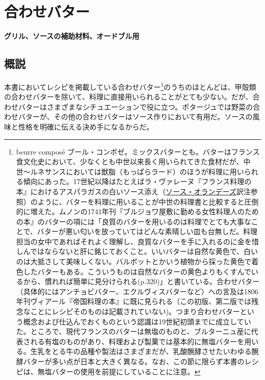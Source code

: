 \hypertarget{beurres-composes}{%
\section{合わせバター}\label{beurres-composes}}

\vspace{-1\zw}
\begin{center}
\textbf{グリル、ソースの補助材料、オードブル用}
\end{center}
\vspace{1\zw}


 

\hypertarget{observation-sur-les-beurres-composes}{%
\subsection{概説}\label{observation-sur-les-beurres-composes}}

本書においてレシピを掲載している合わせバター\footnote{beurre composé
  ブール・コンポゼ。ミックスバターとも。バターはフランス食文化史において、少なくとも中世以来長く用いられてきた食材だが、中世〜ルネサンスにおいては獣脂（もっぱらラード）のほうが料理に用いられる傾向にあった。17世紀以降はたとえばラ・ヴァレーヌ『フランス料理の本』におけるアスパラガスの白いソース添え（\protect\hyperlink{sauce-hollandaise}{ソース・オランデーズ}訳注参照）のように、バターを料理に用いることが中世の料理書と比較すると圧倒的に増えた。ムノンの1741年刊『ブルジョワ屋敷に勤める女性料理人のための本』のバターの項には「良質のバターを用いるのは料理でとても大事なことで、バターが悪い匂いを放っていてはどんな素晴しい皿も台無しだ。料理担当の女中であればそれよく理解し、良質なバターを手に入れるのに金を惜しんではならないと肝に銘じておくこと。いいバターは自然な黄色で、白いのは大抵さして美味しくない。バルボットとかいう植物から採った黄色で着色したバターもある。こういうものは自然なバターの黄色よりもくすんでいるから、慣れれば簡単に見分けられる(p.320)」と書いている。合わせバター（具体的にはアンチョビバター、エクルヴィスバターなど）への言及は1806年刊ヴィアール『帝国料理の本』に既に見られる（この初版、第二版では残念なことにレシピそのものは記載されていない)。つまり合わせバターという概念および仕込んでおくものという認識は19世紀初頭までに成立していた。ところで、現代フランスのバターは無塩のものと、ブルターニュ産に代表される有塩のものがあり、料理および製菓では基本的に無塩バターを用いる。生乳をとる牛の品種や製法はさまざまだが、乳酸醗酵させたいわゆる醗酵バターが多い点が日本と大きく異なる。なお、この節に限らず本書のレシピは、無塩バターの使用を前提にしていることに注意。}のうちのほとんどは、甲殻類の合わせバターを除いて、料理に直接用いられることがとても少ない。だが、合わせバターはさまざまなシチュエーションで役に立つ。ポタージュでは野菜の合わせバターが、その他の合わせバターはソース作りにおいて有用だ。ソースの風味と性格を明確に伝える決め手になるからだ。

